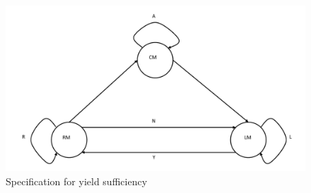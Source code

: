 \begin{figure}
\includegraphics[scale=0.35]{YieldTypeCheckingAutomaton.pdf}
\caption{Specification for yield sufficiency}
\label{fig:YieldTypeCheckingAutomaton}
\end{figure}

